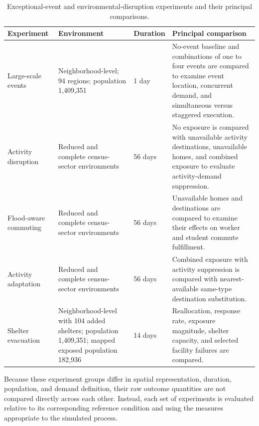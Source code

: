 \begin{table}[ht]
\centering
\footnotesize
\setlength{\tabcolsep}{4pt}
\caption{Exceptional-event and environmental-disruption experiments and their principal comparisons.}
\label{tbl:exceptional_disruption_scenarios}
\begin{tabularx}{\linewidth}{@{}p{2.9cm}p{3.4cm}p{1.7cm}X@{}}
\toprule
\textbf{Experiment} &
\textbf{Environment} &
\textbf{Duration} &
\textbf{Principal comparison} \\
\midrule

Large-scale events
& Neighborhood-level; 94 regions; population 1,409,351
& 1 day
& No-event baseline and combinations of one to four events are compared to examine event location, concurrent demand, and simultaneous versus staggered execution. \\

Activity disruption
& Reduced and complete census-sector environments
& 56 days
& No exposure is compared with unavailable activity destinations, unavailable homes, and combined exposure to evaluate activity-demand suppression. \\

Flood-aware commuting
& Reduced and complete census-sector environments
& 56 days
& Unavailable homes and destinations are compared to examine their effects on worker and student commute fulfillment. \\

Activity adaptation
& Reduced and complete census-sector environments
& 56 days
& Combined exposure with activity suppression is compared with nearest-available same-type destination substitution. \\

Shelter evacuation
& Neighborhood-level with 104 added shelters; population 1,409,351; mapped exposed population 182,936
& 14 days
& Reallocation, response rate, exposure magnitude, shelter capacity, and selected facility failures are compared. \\

\bottomrule
\end{tabularx}
\end{table}

Because these experiment groups differ in spatial representation, duration, population, and demand definition, their raw outcome quantities are not compared directly across each other. Instead, each set of experiments is evaluated relative to its corresponding reference condition and using the measures appropriate to the simulated process.


